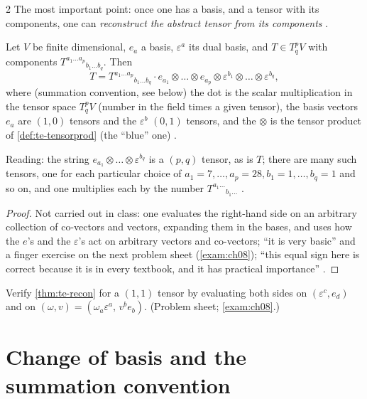 \begin{paracol}{2}
The most important point: once one has a basis, and a tensor with its components, one can \emph{reconstruct the abstract tensor from its components} .
\begin{theorem}\label{thm:te-recon}
Let $V$ be finite dimensional, $e_a$ a basis, $\varepsilon^a$ its dual basis, and $T\in T^p_qV$ with components $T^{a_1\dots a_p}{}_{b_1\dots b_q}$. Then
\[
  T=T^{a_1\dots a_p}{}_{b_1\dots b_q}\cdot e_{a_1}\otimes\dots\otimes e_{a_p}\otimes\varepsilon^{b_1}\otimes\dots\otimes\varepsilon^{b_q},
\]
where (summation convention, see below) the dot is the scalar multiplication in the tensor space $T^p_qV$ (number in the field times a given tensor), the basis vectors $e_a$ are $(1,0)$ tensors and the $\varepsilon^b$ $(0,1)$ tensors, and the $\otimes$ is the tensor product of \cref{def:te-tensorprod} (the ``blue'' one)
.
\end{theorem}
Reading: the string $e_{a_1}\otimes\dots\otimes\varepsilon^{b_q}$ is a $(p,q)$ tensor, as is $T$; there are many such tensors, one for each particular choice of $a_1=7,\dots,a_p=28,b_1=1,\dots,b_q=1$ and so on, and one multiplies each by the number $T^{a_1\dots}{}_{b_1\dots}$
.
\begin{proof}
Not carried out in class: one evaluates the right-hand side on an arbitrary collection of co-vectors and vectors, expanding them in the bases, and uses how the $e$'s and the $\varepsilon$'s act on arbitrary vectors and co-vectors; ``it is very basic'' and a finger exercise on the next problem sheet (\cref{exam:ch08});
``this equal sign here is correct because it is in every textbook, and it has practical importance'' .
\end{proof}
\begin{exercise}[Reconstruction]\label{ex:te-recon}
Verify \cref{thm:te-recon} for a $(1,1)$ tensor by evaluating both sides on $(\varepsilon^c,e_d)$ and on $(\omega,v)=(\omega_a\varepsilon^a,\,v^be_b)$. (Problem sheet; \cref{exam:ch08}.)
\end{exercise}

\section{Change of basis and the summation convention}\label{sec:te-change}


\end{paracol}
